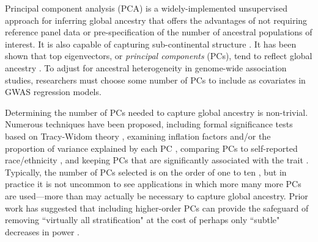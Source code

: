 \documentclass[12pt]{article}
\begin{document}
Principal component analysis (PCA) is a widely-implemented unsupervised approach for inferring global ancestry that offers the advantages of not requiring reference panel data or pre-specification of the number of ancestral populations of interest.
It is also capable of capturing sub-continental structure \citep{novembre2008}. 
It has been shown that top eigenvectors, or \textit{principal components} (PCs), %
tend to reflect global ancestry \citep{patterson2006, mcvean2009}.
To adjust for ancestral heterogeneity in genome-wide association studies, researchers must choose some number of PCs %
to include as covariates in GWAS regression models. 

Determining the number of PCs needed to capture global ancestry is non-trivial. 
Numerous techniques have been proposed, including formal significance tests based on Tracy-Widom theory \citep{patterson2006, eigenstrat}, examining inflation factors \citep{reed2015, conomos2016} and/or the proportion of variance explained by each PC \citep{raska2012, reed2015, conomos2016}, comparing PCs to self-reported race/ethnicity \citep{conomos2016}, and keeping PCs that are significantly associated with the trait \citep{reiner2012, daya2019}.
Typically, the number of PCs selected is on the order of one to ten \citep{abegaz2019}, but in practice it is not uncommon to see applications in which more many more PCs are used---more than may actually be necessary to capture global ancestry. 
Prior work has suggested that including higher-order PCs can provide the safeguard of removing ``virtually all stratification" \citep{mathieson2012} at the cost of perhaps only ``subtle" decreases in power \citep{liu2011}.
\end{document}
